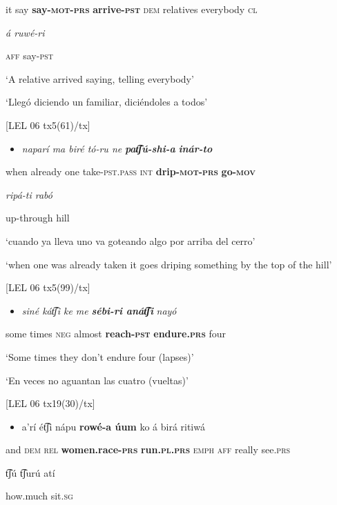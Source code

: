 it    say    \textbf{say-\textsc{mot-prs} }\textbf{arrive-\textsc{pst}} \textsc{dem} relatives        everybody   \textsc{cl} 

\textit{á       ruwé-ri} 

\textsc{aff} say-\textsc{pst}    

  ‘A relative arrived saying, telling everybody’

  ‘Llegó diciendo un familiar, diciéndoles a todos’ 

[LEL 06 tx5(61)/tx]

\begin{itemize}
\item \textit{naparí   ma     biré   tó-ru     ne} \textbf{\textit{pat͡ʃú-shi-a}} \textbf{\textit{inár-to}} 
\end{itemize}

  when   already   one   take-\textsc{pst.pass  int} \textbf{drip-\textsc{mot-prs}}    \textbf{go-\textsc{mov}}

  \textit{ripá-ti     rabó}

up-through   hill  

  ‘cuando ya lleva uno va goteando algo por arriba del cerro’ 

  ‘when one was already taken it goes driping something by the top of the hill’

[LEL 06 tx5(99)/tx]

\begin{itemize}
\item \textit{siné   kát͡ʃi   ke   me} \textbf{\textit{sébi-ri     anát͡ʃi}} \textit{nayó}
\end{itemize}

  some   times   \textsc{neg} almost  \textbf{reach-\textsc{pst} }\textbf{endure.\textsc{prs}}   four

  ‘Some times they don’t endure four (lapses)’

  ‘En veces no aguantan las cuatro (vueltas)’

  [LEL 06 tx19(30)/tx]

\begin{itemize}
\item a’rí   ét͡ʃi   nápu   \textbf{rowé-a     úum}     ko   á   birá   ritiwá   
\end{itemize}

  and   \textsc{dem   rel}   \textbf{women.race-\textsc{prs} }\textbf{run\textsc{.pl.prs}} \textsc{emph   aff} really   see.\textsc{prs}

 t͡ʃú t͡ʃurú   atí

how.much   sit\textsc{.sg}

